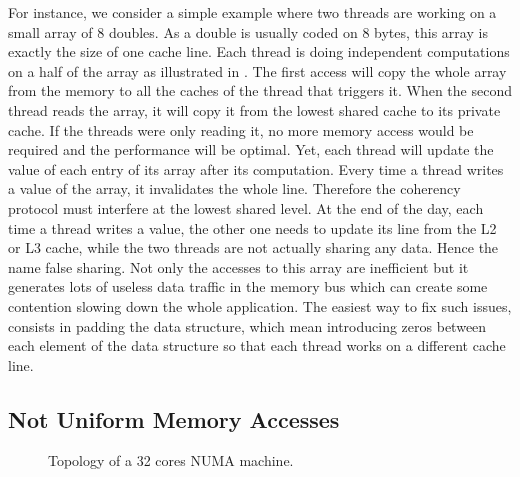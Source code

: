 For instance, we  consider a simple example where two threads are working on a small array of $8$ doubles.
As a double is usually coded on $8$ bytes, this array is exactly the size of one cache line.
Each thread is doing independent computations on a half of the array as illustrated in .
The first access will copy the whole array from the memory to all the caches of the thread that triggers it.
When the second thread reads the array, it will copy it from the lowest shared cache to its private cache.
If the threads were only reading it, no more memory access would be required and the performance will be optimal.
Yet, each thread will update the value of each entry of its array after its computation.
Every time a thread writes a value of the array, it invalidates the whole line.
Therefore the coherency protocol must interfere at the lowest shared level.
At the end of the day, each time a thread writes a value, the other one needs to update its line from the L2 or L3 cache, while the two threads are not actually sharing any data.
Hence the name false sharing.
Not only the accesses to this array are inefficient but it generates lots of useless data traffic in the memory bus which can create some contention slowing down the whole application.
The easiest way to fix such issues, consists in padding the data structure, which mean introducing zeros between each element of the data structure so that each thread works on a different cache line.

\subsection{Not Uniform Memory Accesses}

\begin{figure}[htb]
    \centering
    
    \caption{Topology of a 32 cores NUMA machine.}
    \label{fig:topo-NUMA}
\end{figure}

